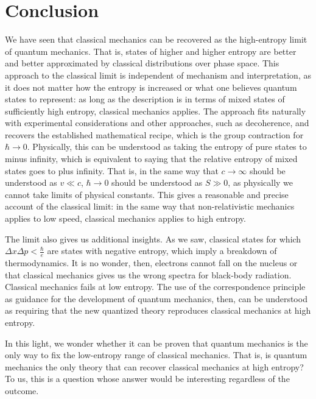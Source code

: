 \documentclass{article}
\begin{document}
\section{Conclusion}

We have seen that classical mechanics can be recovered as the high-entropy limit of quantum mechanics. That is, states of higher and higher entropy are better and better approximated by classical distributions over phase space. This approach to the classical limit is independent of mechanism and interpretation, as it does not matter how the entropy is increased or what one believes quantum states to represent: as long as the description is in terms of mixed states of sufficiently high entropy, classical mechanics applies. The approach fits naturally with experimental considerations and other approaches, such as decoherence, and recovers the established mathematical recipe, which is the group contraction for $\hbar \to 0$. Physically, this can be understood as taking the entropy of pure states to minus infinity, which is equivalent to saying that the relative entropy of mixed states goes to plus infinity. That is, in the same way that $c \to \infty$ should be understood as $v \ll c$, $\hbar \to 0$ should be understood as $S \gg 0$, as physically we cannot take limits of physical constants. This gives a reasonable and precise account of the classical limit: in the same way that non-relativistic mechanics applies to low speed, classical mechanics applies to high entropy.

The limit also gives us additional insights. As we saw, classical states for which $\Delta x \Delta p < \frac{\hbar}{e}$ are states with negative entropy, which imply a breakdown of thermodynamics. It is no wonder, then, electrons cannot fall on the nucleus or that classical mechanics gives us the wrong spectra for black-body radiation. Classical mechanics fails at low entropy. The use of the correspondence principle as guidance for the development of quantum mechanics, then, can be understood as requiring that the new quantized theory reproduces classical mechanics at high entropy. 

In this light, we wonder whether it can be proven that quantum mechanics is the only way to fix the low-entropy range of classical mechanics. That is, is quantum mechanics the only theory that can recover classical mechanics at high entropy? To us, this is a question whose answer would be interesting regardless of the outcome.



\end{document}
